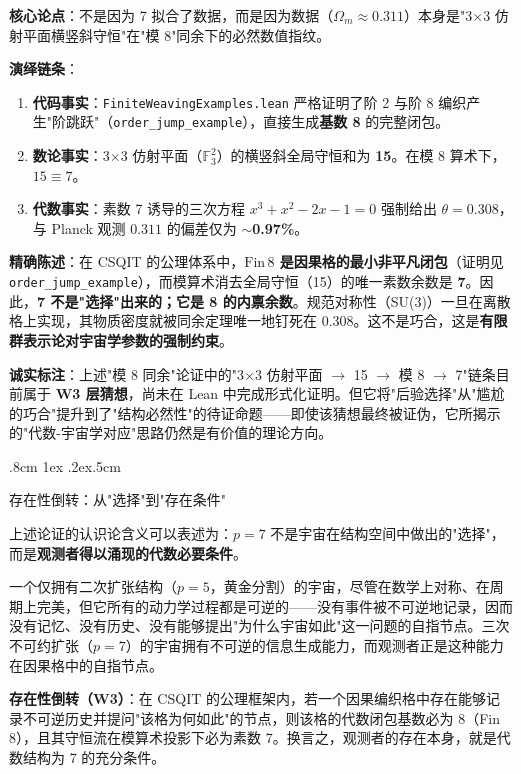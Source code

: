 \documentclass[aps,prd,twocolumn,nofootinbib,floatfix]{revtex4-2}
\makeatletter
\def\subsubsection{%
  \@startsection{subsubsection}{3}{\z@}
    {.8cm \@plus1ex \@minus .2ex}{.5cm}
    {\normalfont\normalsize\bfseries\itshape\raggedright}%
}
\makeatother
\begin{document}
\textbf{核心论点}：不是因为 7 拟合了数据，而是因为数据（$\Omega_m \approx 0.311$）本身是"3$\times$3 仿射平面横竖斜守恒"在"模 8"同余下的必然数值指纹。

\textbf{演绎链条}：
\begin{enumerate}
    \item \textbf{代码事实}：\texttt{FiniteWeavingExamples.lean} 严格证明了阶 2 与阶 8 编织产生"阶跳跃"（\texttt{order\_jump\_example}），直接生成\textbf{基数 8} 的完整闭包。
    \item \textbf{数论事实}：3$\times$3 仿射平面（$\mathbb{F}_3^2$）的横竖斜全局守恒和为 \textbf{15}。在模 8 算术下，$15 \equiv 7$。
    \item \textbf{代数事实}：素数 7 诱导的三次方程 $x^3 + x^2 - 2x - 1 = 0$ 强制给出 $\theta = 0.308$，与 Planck 观测 $0.311$ 的偏差仅为 \textbf{$\sim$0.97\%}。
\end{enumerate}

\textbf{精确陈述}：在 CSQIT 的公理体系中，\textbf{$\text{Fin}\,8$ 是因果格的最小非平凡闭包}（证明见 \texttt{order\_jump\_example}），而模算术消去全局守恒（15）的唯一素数余数是 \textbf{7}。因此，\textbf{7 不是"选择"出来的；它是 8 的内禀余数}。规范对称性（SU(3)）一旦在离散格上实现，其物质密度就被同余定理唯一地钉死在 0.308。这不是巧合，这是\textbf{有限群表示论对宇宙学参数的强制约束}。

\medskip
\noindent\textbf{诚实标注}：上述"模 8 同余"论证中的"3$\times$3 仿射平面 $\to$ 15 $\to$ 模 8 $\to$ 7"链条目前属于 \textbf{W3 层猜想}，尚未在 Lean 中完成形式化证明。但它将"后验选择"从"尴尬的巧合"提升到了"结构必然性"的待证命题——即使该猜想最终被证伪，它所揭示的"代数-宇宙学对应"思路仍然是有价值的理论方向。

\subsubsection{存在性倒转：从"选择"到"存在条件"}

上述论证的认识论含义可以表述为：$p=7$ 不是宇宙在结构空间中做出的"选择"，而是\textbf{观测者得以涌现的代数必要条件}。

一个仅拥有二次扩张结构（$p=5$，黄金分割）的宇宙，尽管在数学上对称、在周期上完美，但它所有的动力学过程都是可逆的——没有事件被不可逆地记录，因而没有记忆、没有历史、没有能够提出"为什么宇宙如此"这一问题的自指节点。三次不可约扩张（$p=7$）的宇宙拥有不可逆的信息生成能力，而观测者正是这种能力在因果格中的自指节点。

\textbf{存在性倒转（W3）}：在 CSQIT 的公理框架内，若一个因果编织格中存在能够记录不可逆历史并提问"该格为何如此"的节点，则该格的代数闭包基数必为 8（Fin 8），且其守恒流在模算术投影下必为素数 7。换言之，观测者的存在本身，就是代数结构为 7 的充分条件。
\end{document}
